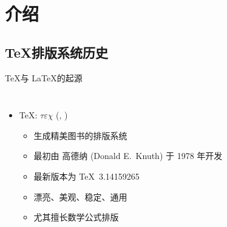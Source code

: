 

\section{介绍}

\subsection{\TeX 排版系统历史}

\begin{frame}[fragile]{\TeX 与 \LaTeX 的起源}
  \begin{columns}[T]
    \begin{itemize}
      \item \TeX: $\tau\varepsilon\chi$ (,
        )
        \begin{itemize}
          \item 生成精美图书的排版系统
          \item 最初由 高德纳 (Donald E.~Knuth) 于 1978 年开发
          \item 最新版本为 \TeX\ 3.14159265
          \item 漂亮、美观、稳定、通用
          \item 尤其擅长数学公式排版
        \end{itemize}


\end{itemize}
\end{columns}
\end{frame}
